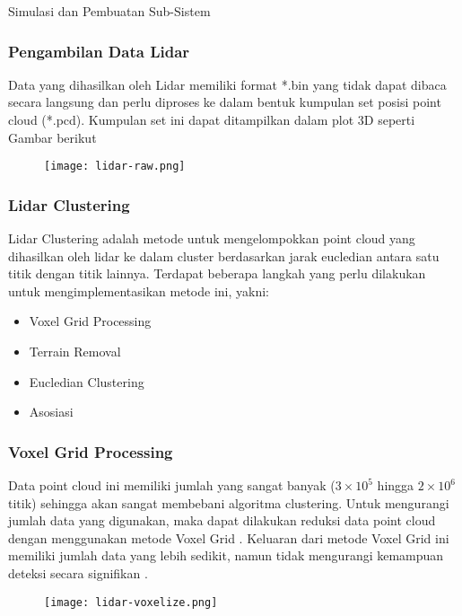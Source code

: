 \begin{frame}
    \Huge
    \begin{center}
        Simulasi dan Pembuatan Sub-Sistem
    \end{center}
\end{frame}


\begin{frame}
    \frametitle{Pengambilan Data Lidar}
    
    Data yang dihasilkan oleh Lidar memiliki format *.bin yang tidak dapat dibaca secara langsung dan perlu diproses ke dalam bentuk kumpulan set posisi point cloud (*.pcd). Kumpulan set ini dapat ditampilkan dalam plot 3D seperti Gambar berikut

    \begin{figure}
        \centering
        \texttt{[image: lidar-raw.png]}
        \label{fig: lidar-plot3d-raw}
    \end{figure}
\end{frame}


\begin{frame}[allowframebreaks]
    
\end{frame}


\begin{frame}
    \frametitle{Lidar Clustering}
    Lidar Clustering adalah metode untuk mengelompokkan point cloud yang dihasilkan oleh lidar ke dalam cluster berdasarkan jarak eucledian antara satu titik dengan titik lainnya. Terdapat beberapa langkah yang perlu dilakukan untuk mengimplementasikan metode ini, yakni:

    \begin{itemize}
        \item Voxel Grid Processing \\
        \item Terrain Removal \\
        \item Eucledian Clustering \\
        \item Asosiasi
    \end{itemize}
\end{frame}


\begin{frame}
    \frametitle{Voxel Grid Processing}

    Data point cloud ini memiliki jumlah yang sangat banyak ($3 \times 10^5$ hingga $2 \times 10^6$ titik) sehingga akan sangat membebani algoritma clustering. Untuk mengurangi jumlah data yang digunakan, maka dapat dilakukan reduksi data point cloud dengan menggunakan metode Voxel Grid \cite{open3d_2018}. Keluaran dari metode Voxel Grid ini memiliki jumlah data yang lebih sedikit, namun tidak mengurangi kemampuan deteksi secara signifikan \cite{open3d_2018}.
    \begin{figure}
        \centering
        \texttt{[image: lidar-voxelize.png]}
    \end{figure}
\end{frame}


